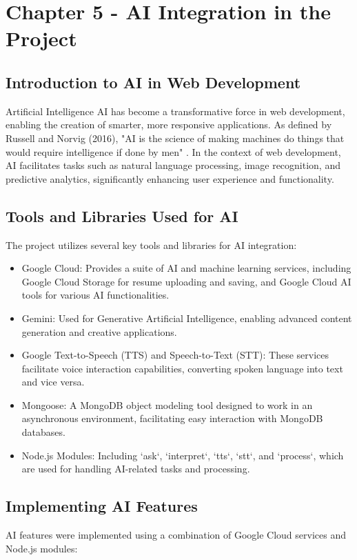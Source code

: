 \section{Chapter 5 - AI Integration in the Project}

\subsection{Introduction to AI in Web Development}
Artificial Intelligence \gls{AI} has become a transformative force in web development, enabling the creation of smarter, more responsive applications. As defined by Russell and Norvig (2016), "AI is the science of making machines do things that would require intelligence if done by men" \cite{russell2016artificial}. In the context of web development, AI facilitates tasks such as natural language processing, image recognition, and predictive analytics, significantly enhancing user experience and functionality.

\subsection{Tools and Libraries Used for AI}
The project utilizes several key tools and libraries for AI integration:

\begin{itemize}
    \item Google Cloud: Provides a suite of AI and machine learning services, including Google Cloud Storage for resume uploading and saving, and Google Cloud AI tools for various AI functionalities.
    \item Gemini: Used for Generative Artificial Intelligence, enabling advanced content generation and creative applications.
    \item Google Text-to-Speech (TTS) and Speech-to-Text (STT): These services facilitate voice interaction capabilities, converting spoken language into text and vice versa.
    \item Mongoose: A MongoDB object modeling tool designed to work in an asynchronous environment, facilitating easy interaction with MongoDB databases.
    \item Node.js Modules: Including `ask`, `interpret`, `tts`, `stt`, and `process`, which are used for handling AI-related tasks and processing.
\end{itemize}

\subsection{Implementing AI Features}
AI features were implemented using a combination of Google Cloud services and Node.js modules:

